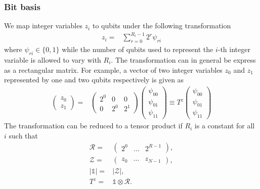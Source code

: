\documentclass[prd,twocolumn,tightenlines,preprintnumbers,showpacs,superscriptaddress,notitlepage,nofootinbib,eqsecnum,floatfix,longbibliography]{revtex4}
\begin{document}
\subsubsection{Bit basis}
\label{sec:methods:bit-basis}

We map integer variables $z_i$ to qubits under the following transformation~\cite{Chang:2018uoc}
\begin{align}
    z_i = & \sum_{r=0}^{R_i-1} 2^r \psi_{ri}
\label{eq:int_to_bin}
\end{align}
where $\psi_{ri} \in \{0, 1\}$ while the number of qubits used to represent the $i$-th integer variable is allowed to vary with $R_i$.
The transformation can in general be express as a rectangular matrix.
For example, a vector of two integer variables $z_0$ and $z_1$ represented by one and two qubits respectively is given as
\begin{align}
    \begin{pmatrix}
    z_0\\
    z_1
    \end{pmatrix}
    = &
    \begin{pmatrix}
    2^0 & 0 & 0\\
    0 & 2^0 & 2^1
    \end{pmatrix}
    \begin{pmatrix}
    \psi_{00}\\
    \psi_{01}\\
    \psi_{11}
    \end{pmatrix}
    \equiv T^z \begin{pmatrix}
    \psi_{00}\\
    \psi_{01}\\
    \psi_{11}
    \end{pmatrix}
\end{align}
The transformation can be reduced to a tensor product if $R_i$ is a constant for all $i$ such that
\begin{align}
    \mathcal{R} = & \begin{pmatrix} 2^0 & \dots & 2^{R-1}\end{pmatrix},\\
    \mathcal{Z} = & \begin{pmatrix} z_0 & \dots & z_{N-1}\end{pmatrix},\\
    |\mathds{1}| = & |\mathcal{Z}|,\\
    T^z = & \mathds{1}\otimes \mathcal{R}.
\end{align}
\end{document}
